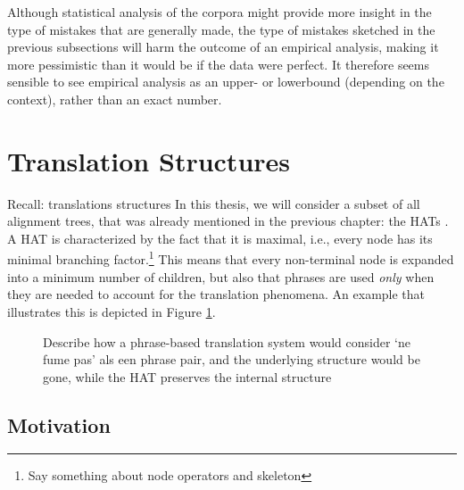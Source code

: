 \documentclass{report}
\begin{document}
Although statistical analysis of the corpora might provide more insight in the type of mistakes that are generally made, the type of mistakes sketched in the previous subsections will harm the outcome of an empirical analysis, making it more pessimistic than it would be if the data were perfect. It therefore seems sensible to see empirical analysis as an upper- or lowerbound (depending on the context), rather than an exact number.



\section{Translation Structures}



Recall: translations structures
In this thesis, we will consider a subset of all alignment trees, that was already mentioned in the previous chapter: the HATs \citep{simaan2013hats}. A HAT is characterized by the fact that it is maximal, i.e., every node has its minimal branching factor.\footnote{Say something about node operators and skeleton} This means that every non-terminal node is expanded into a minimum number of children, but also that phrases are used \textit{only} when they are needed to account for the translation phenomena. An example that illustrates this is depicted in Figure \ref{fig:treephrase}.

\begin{figure}
\centering
{}
\caption{Describe how a phrase-based translation system would consider `ne fume pas' als een phrase pair, and the underlying structure would be gone, while the HAT preserves the internal structure}\label{fig:treephrase}
\end{figure}


\subsection{Motivation}
\end{document}
